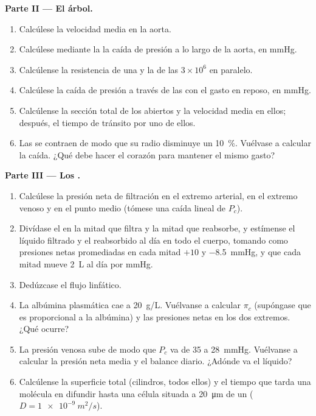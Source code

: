 \begin{problem}
\medskip
\noindent\textbf{Parte II --- El árbol.}
\begin{enumerate}[resume]
  \item Calcúlese la velocidad media en la aorta.
  \item Calcúlese mediante la  la caída de presión a lo
        largo de la aorta, en mmHg.
  \item Calcúlense la resistencia de una  y la de las $3\times
        10^{6}$ en paralelo.
  \item Calcúlese la caída de presión a través de las  con el
        gasto en reposo, en mmHg.
  \item Calcúlense la sección total de los  abiertos y la
        velocidad media en ellos; después, el tiempo de tránsito por uno
        de ellos.
  \item Las  se contraen de modo que su radio disminuye un
        \qty{10}{\%}. Vuélvase a calcular la caída. ¿Qué debe hacer el
        corazón para mantener el mismo gasto?
\end{enumerate}

\medskip
\noindent\textbf{Parte III --- Los .}
\begin{enumerate}[resume]
  \item Calcúlese la presión neta de filtración en el extremo arterial,
        en el extremo venoso y en el punto medio (tómese una caída lineal
        de $P_c$).
  \item Divídase el  en la mitad que filtra y la mitad que
        reabsorbe, y estímense el líquido filtrado y el reabsorbido al día
        en todo el cuerpo, tomando como presiones netas promediadas en cada
        mitad $+10$ y
        \qty{-8.5}{mmHg}, y que cada mitad mueve \qty{2}{L} al día por
        mmHg.
  \item Dedúzcase el flujo linfático.
  \item La albúmina plasmática cae a \qty{20}{g/L}. Vuélvanse a calcular
        $\pi_c$ (supóngase que es proporcional a la albúmina) y las
        presiones netas en los dos extremos. ¿Qué ocurre?
  \item La presión venosa sube de modo que $P_c$ va de 35 a
        \qty{28}{mmHg}. Vuélvanse a calcular la presión neta media y el
        balance diario. ¿Adónde va el líquido?
  \item Calcúlense la superficie  total (cilindros, todos ellos) y
        el tiempo que tarda una molécula en difundir hasta una célula
        situada a \qty{20}{\micro m} de un 
        ($D = \qty{1e-9}{m^2/s}$).
\end{enumerate}


\end{problem}
